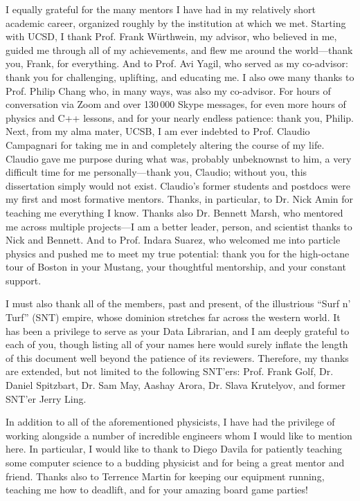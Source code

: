 \begin{acknowledgements}
I equally grateful for the many mentors I have had in my relatively short academic career, organized roughly by the institution at which we met. 
Starting with UCSD, I thank Prof. Frank W\"urthwein, my advisor, who believed in me, guided me through all of my achievements, and flew me around the world---thank you, Frank, for everything. 
And to Prof. Avi Yagil, who served as my co-advisor: thank you for challenging, uplifting, and educating me. 
I also owe many thanks to Prof. Philip Chang who, in many ways, was also my co-advisor. 
For hours of conversation via Zoom and over 130\,000 Skype messages, for even more hours of physics and C++ lessons, and for your nearly endless patience: thank you, Philip. 
Next, from my alma mater, UCSB, I am ever indebted to Prof. Claudio Campagnari for taking me in and completely altering the course of my life. 
Claudio gave me purpose during what was, probably unbeknownst to him, a very difficult time for me personally---thank you, Claudio; without you, this dissertation simply would not exist. 
Claudio's former students and postdocs were my first and most formative mentors. 
Thanks, in particular, to Dr. Nick Amin for teaching me everything I know. 
Thanks also Dr. Bennett Marsh, who mentored me across multiple projects---I am a better leader, person, and scientist thanks to Nick and Bennett. 
And to Prof. Indara Suarez, who welcomed me into particle physics and pushed me to meet my true potential: thank you for the high-octane tour of Boston in your Mustang, your thoughtful mentorship, and your constant support. 

I must also thank all of the members, past and present, of the illustrious ``Surf n' Turf'' (SNT) empire, whose dominion stretches far across the western world. 
It has been a privilege to serve as your Data Librarian, and I am deeply grateful to each of you, though listing all of your names here would surely inflate the length of this document well beyond the patience of its reviewers. 
Therefore, my thanks are extended, but not limited to the following SNT'ers: Prof. Frank Golf, Dr. Daniel Spitzbart, Dr. Sam May, Aashay Arora, Dr. Slava Krutelyov, and former SNT'er Jerry Ling.

In addition to all of the aforementioned physicists, I have had the privilege of working alongside a number of incredible engineers whom I would like to mention here. 
In particular, I would like to thank to Diego Davila for patiently teaching some computer science to a budding physicist and for being a great mentor and friend. 
Thanks also to Terrence Martin for keeping our equipment running, teaching me how to deadlift, and for your amazing board game parties! 


\end{acknowledgements}
